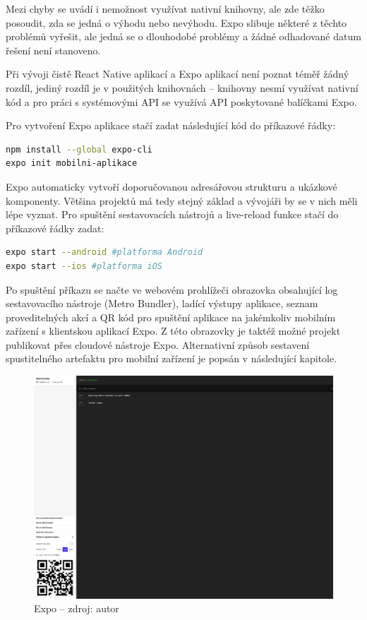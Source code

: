 Mezi chyby se uvádí i nemožnost využívat nativní knihovny, ale zde těžko posoudit, zda se jedná o výhodu nebo nevýhodu. Expo slibuje některé z těchto problémů vyřešit, ale jedná se o dlouhodobé problémy a žádné odhadované datum řešení není stanoveno. 

Při vývoji čistě React Native aplikací a Expo aplikací není poznat téměř žádný rozdíl, jediný rozdíl je v použitých knihovnách -- knihovny nesmí využívat nativní kód a pro práci s systémovými API se využívá API poskytované balíčkami Expo.

Pro vytvoření Expo aplikace stačí zadat následující kód do příkazové řádky:

\begin{lstlisting}[language=Bash, caption=Vytvoření základní struktury aplikace,label={expoinstall}]
npm install --global expo-cli
expo init mobilni-aplikace
\end{lstlisting}

Expo automaticky vytvoří doporučovanou adresářovou strukturu a ukázkové komponenty. Většina projektů má tedy stejný základ a vývojáři by se v nich měli lépe vyznat. Pro spuštění sestavovacích nástrojů a live-reload funkce stačí do příkazové řádky zadat:

\begin{lstlisting}[language=Bash, caption=Spuštění mobilní aplikace na virtuálním stroji nebo připojeném zařízení,label={expostart}]
expo start --android #platforma Android
expo start --ios #platforma iOS
\end{lstlisting}

Po spuštění příkazu se načte ve webovém prohlížeči obrazovka obsahující log sestavovacího nástroje (Metro Bundler), ladící výstupy aplikace, seznam proveditelných akcí a QR kód pro spuštění aplikace na jakémkoliv mobilním zařízení s klientskou aplikací Expo. Z této obrazovky je taktéž možné projekt publikovat přes cloudové nástroje Expo. Alternativní způsob sestavení spustitelného artefaktu pro mobilní zařízení je popsán v následující kapitole.

\begin{figure}[h]
	\begin{center}
		\includegraphics[width=140mm]{img/expo.png}
	\end{center}
	\caption{Expo -- zdroj: autor}
\end{figure}

